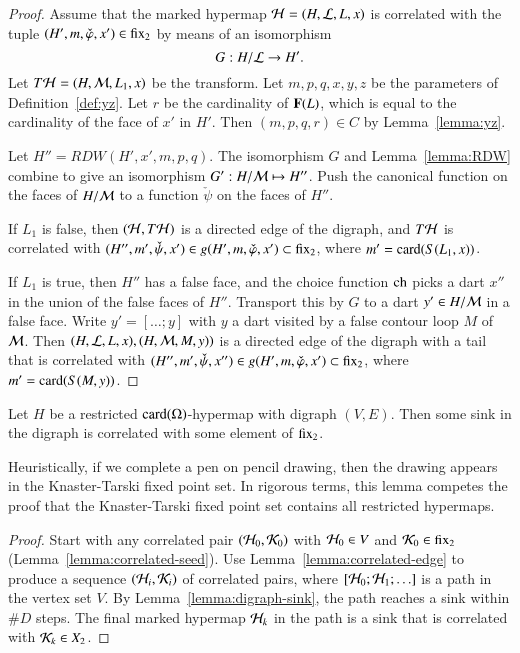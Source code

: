 \begin{proof}  Assume that the marked hypermap ${\cal H}=(H,{\cal L},L,x)$
is correlated with the tuple $(H',m,\check\varphi,x')\in {\operatorname{fix}}_2$
by means of an isomorphism
\[ 
G: H/{\cal L} \to H'.
\] 
Let $T{\cal H} = (H,{\cal M},L_1,x)$ be the transform.  Let $m,p,q,x,y,z$
be the parameters of Definition~\ref{def:yz}.  Let $r$ be the cardinality
of ${\mathbf F}(L)$, which is equal to the cardinality of the face of $x'$ in $H'$.  
Then $(m,p,q,r)\in C$ by Lemma~\ref{lemma:yz}.

Let $H'' = RDW(H',x',m,p,q)$.  The isomorphism $G$ and
Lemma~\ref{lemma:RDW} combine to give an isomorphism $G':H/{\cal M}
\mapsto H''$.  Push the canonical function on the faces of $H/{\cal
  M}$ to a function $\check\psi$ on the faces of $H''$.

If $L_1$ is false, then $({\cal H},T{\cal H})$ is a directed edge of
the digraph, and $T{\cal H}$ is correlated with
$(H'',m',\check\psi,x')\in g(H',m,\check\varphi,x')\subset
{\operatorname{fix}}_2$, where $m'={\operatorname{card}}(S(L_1,x))$.

If $L_1$ is true, then $H''$ has a false face, and the choice function
${\operatorname{ch}}$ picks a dart $x''$ in the union of the false faces of $H''$.
Transport this by $G$ to a dart $y'\in H/{\cal M}$ in a false face.
Write $y'=[\ldots;y]$ with $y$ a dart visited by a false contour loop
$M$ of ${\cal M}$.  Then $(H,{\cal L},L,x),(H,{\cal M},M,y))$ is a
directed edge of the digraph with a tail that is correlated with
$(H'',m',\check\psi,x'')\in g(H',m,\check\varphi,x')\subset
{\operatorname{fix}}_2$, where $m'={\operatorname{card}}(S(M,y))$.
\end{proof}

\begin{lemma}\label{lemma:correlated-sink}
Let $H$ be a restricted ${\operatorname{card}}(\Omega)$-hypermap with digraph $(V,E)$.
Then some sink in the digraph is correlated with some element of
${\operatorname{fix}}_2$.
\end{lemma}

Heuristically, if we complete a pen on pencil drawing, then the
drawing appears in the Knaster-Tarski fixed point set.  In rigorous
terms, this lemma competes the proof that the Knaster-Tarski fixed
point set contains all restricted hypermaps.

\begin{proof} Start with any correlated pair $({\cal H}_0,{\cal K}_0)$
  with ${\cal H}_0\in V$ and ${\cal K}_0\in {\operatorname{fix}}_2$
  (Lemma~\ref{lemma:correlated-seed}).  Use
  Lemma~\ref{lemma:correlated-edge} to produce a sequence $({\cal
    H}_i,{\cal K}_i)$ of correlated pairs, where $[{\cal H}_0;{\cal
    H}_1;\ldots]$ is a path in the vertex set $V$.  By
  Lemma~\ref{lemma:digraph-sink}, the path reaches a sink within $\#D$
  steps.  The final marked hypermap ${\cal H}_k$ in the path is a sink
  that is correlated with ${\cal K}_k\in X_2$.
\end{proof}

